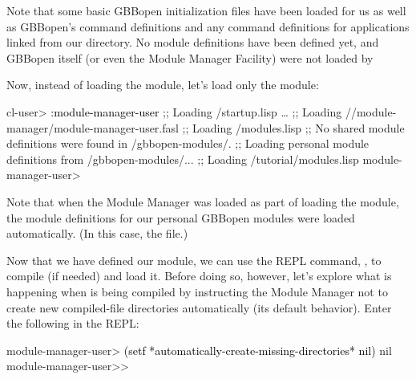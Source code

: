 \documentclass[10pt,twoside,english,pdftex]{article}
\begin{document}
Note that some basic GBBopen initialization files have been loaded for us as
well as GBBopen's command definitions and any command definitions for
applications linked from our 
directory. No module definitions have been defined yet, and GBBopen itself (or
even the Module Manager Facility) were not loaded by

Now, instead of loading the  module, let's
load only the  module:
%
\W\supp
\begin{smallexample}
\textcolor{darkergray}{%
  cl-user> \textcolor{black}{:module-manager-user}
  ;; Loading /startup.lisp
     \textrm{\ldots{}}
  ;;     Loading //module-manager/module-manager-user.fasl
  ;;   Loading /modules.lisp
  ;; No shared module definitions were found in /gbbopen-modules/.
  ;; Loading personal module definitions from /gbbopen-modules/...
  ;;     Loading /tutorial/modules.lisp
  module-manager-user>}
\end{smallexample}
%
Note that when the Module Manager was loaded as part of loading the
 module, the module definitions for our
personal GBBopen modules were loaded automatically.  (In this case, the
 file.)

%
%
Now that we have defined our  module, we can use the
 REPL command, , to compile (if
needed) and load it. Before doing so, however, let's explore what is happening
when  is being compiled by instructing the Module Manager not
to create new compiled-file directories automatically (its default behavior).
Enter the following in the REPL:
%
\W\supp
\begin{example}
\textcolor{darkergray}{%
  module-manager-user> \textcolor{black}{(setf *automatically-create-missing-directories* nil)}
  nil
  module-manager-user>>}
\end{example}
\end{document}
